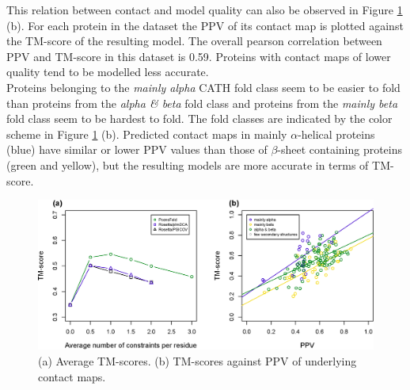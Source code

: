 \documentclass{bioinfo}
\begin{document}
This relation between contact and model quality can also be observed in Figure \ref{fig:main} (b). For each protein in the dataset the PPV of its contact map is plotted against the TM-score of the resulting model. The overall pearson correlation between PPV and TM-score in this dataset is 0.59. Proteins with contact maps of lower quality tend to be modelled less accurate. \\\indent
Proteins belonging to the {\it mainly alpha} CATH fold class seem to be easier to fold than proteins from the {\it alpha \& beta} fold class and proteins from the {\it mainly beta} fold class seem to be hardest to fold. The fold classes are indicated by the color scheme in Figure \ref{fig:main} (b). Predicted contact maps in mainly $\alpha$-helical proteins (blue) have similar or lower PPV values than those of $\beta$-sheet containing proteins (green and yellow), but the resulting models are more accurate in terms of TM-score.
\begin{figure}[!tpb]%
    \centerline{\includegraphics[scale=0.35]{figures/tmscores.eps}}
\caption{(a) Average TM-scores. (b) TM-scores against PPV of underlying contact maps.}\label{fig:main}
\end{figure}
\end{document}
